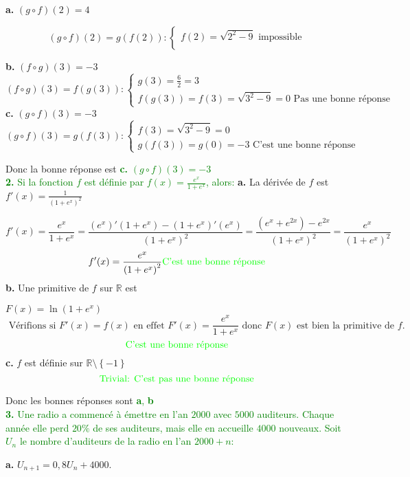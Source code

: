 \documentclass[12pt]{article}
\begin{document}
\textbf{a.} $(g\circ f)(2)=4$

\[
(g\circ f)(2)=g(f(2)):
\begin{cases}
f(2)=\sqrt{2^{2}-9} \text{ impossible }\\
\end{cases}
\]

\textbf{b.} $(f\circ g)(3)=-3$
 \[
(f\circ g)(3)=f(g(3)):
\begin{cases}
g(3)=\frac{6}{2}=3\\
f(g(3))=f(3)=\sqrt{3^{2}-9}=0 \text{ Pas une bonne réponse }
\end{cases}
\]
\textbf{c.} $(g\circ f)(3)=-3$
\[
(g\circ f)(3)=g(f(3)):
\begin{cases}
f(3)=\sqrt{3^{2}-9}=0\\
g(f(3))=g(0)=-3 \text{ C'est une bonne réponse }
\end{cases}
\]

Donc la bonne réponse est \textcolor{green}{\textbf{c.} $(g\circ f)(3)=-3$}\\

\textcolor{green}{ \textbf{2.} Si la fonction $f$ est définie par $f(x)=\frac{e^{x}}{1+e^{x}}$, alors: }
\newpage
\textbf{a.} La dérivée de $f$ est $f'(x)=\frac{1}{\left(1+e^{x}\right)^{2}}$

\[
f'(x)=\frac{e^{x}}{1+e^{x}}=\frac{(e^{x})'(1+e^{x})-(1+e^{x})'(e^{x})}{\left( 1+e^{x} \right)^{2}  }=\frac{(e^{x}+e^{2x})-e^{2x}}{\left( 1+e^{x} \right)^{2}}=\frac{e^{x}}{\left( 1+e^{x} \right)^{2}}
\]
\[f'(x)=\frac{e^{x}}{\left( 1+e^{x} \right)^{2}} \text{\textcolor{green} {C'est une bonne réponse }}\]
\textbf{b.} Une primitive de $f$ sur $\mathbb{R}$ est

$F(x)=\ln(1+e^{x})$
\[\text{ Vérifions si } F'(x)=f(x) \text{ en effet } F'(x)=\frac{e^{x}}{1+e^{x}} \text{ donc } F(x) \text{ est bien la primitive de } f. \]
\[\text{\textcolor{green} {C'est une bonne réponse }}\]
\textbf{c.} $f$ est définie sur $\mathbb{R}\setminus\left\lbrace -1\right\rbrace $
\[\text{\textcolor{green} {Trivial: C'est pas une bonne réponse }}\]

Donc les bonnes réponses sont \textcolor{green}{\textbf{a}, \textbf{b}}\\

\textcolor{green}{\textbf{3.} Une radio a commencé à émettre en l'an $2000$ avec $5000$ auditeurs. Chaque année elle perd  $20\%$ de ses auditeurs, mais elle en accueille $4000$ nouveaux. Soit $U_{n}$ le nombre d'auditeurs de la radio en  l'an $2000+n$:} 

\textbf{a.} $U_{n+1}=0,8U_{n}+4000$.
 
\end{document}
